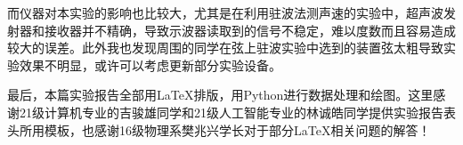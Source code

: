 \documentclass[12pt]{article}
\begin{document}
而仪器对本实验的影响也比较大，尤其是在利用驻波法测声速的实验中，超声波发射器和接收器并不精确，导致示波器读取到的信号不稳定，难以度数而且容易造成较大的误差。此外我也发现周围的同学在弦上驻波实验中选到的装置弦太粗导致实验效果不明显，或许可以考虑更新部分实验设备。

最后，本篇实验报告全部用\LaTeX{}排版，用Python进行数据处理和绘图。这里感谢21级计算机专业的吉骏雄同学和21级人工智能专业的林诚皓同学提供实验报告表头所用模板，也感谢16级物理系樊兆兴学长对于部分\LaTeX{}相关问题的解答！
\end{document}
